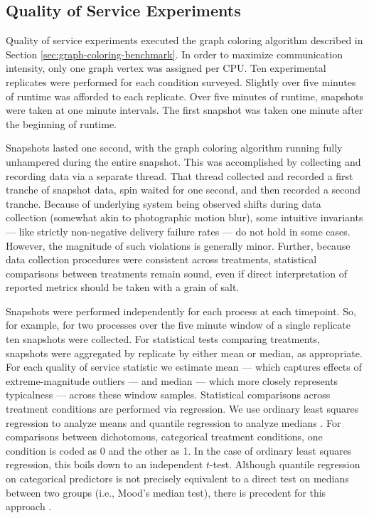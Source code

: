 \subsection{Quality of Service Experiments} \label{sec:quality-of-service-experiments}

Quality of service experiments executed the graph coloring algorithm described in Section \ref{sec:graph-coloring-benchmark}.
In order to maximize communication intensity, only one graph vertex was assigned per CPU.
Ten experimental replicates were performed for each condition surveyed.
Slightly over five minutes of runtime was afforded to each replicate.
Over five minutes of runtime, snapshots were taken at one minute intervals.
The first snapshot was taken one minute after the beginning of runtime.

Snapshots lasted one second, with the graph coloring algorithm running fully unhampered during the entire snapshot.
This was accomplished by collecting and recording data via a separate thread.
That thread collected and recorded a first tranche of snapshot data, spin waited for one second, and then recorded a second tranche.
Because of underlying system being observed shifts during data collection (somewhat akin to photographic motion blur), some intuitive invariants --- like strictly non-negative delivery failure rates --- do not hold in some cases.
However, the magnitude of such violations is generally minor.
Further, because data collection procedures were consistent across treatments, statistical comparisons between treatments remain sound, even if direct interpretation of reported metrics should be taken with a grain of salt.

Snapshots were performed independently for each process at each timepoint.
So, for example, for two processes over the five minute window of a single replicate ten snapshots were collected.
For statistical tests comparing treatments, snapshots were aggregated by replicate by either mean or median, as appropriate.
For each quality of service statistic we estimate mean --- which captures effects of extreme-magnitude outliers --- and median --- which more closely represents typicalness --- across these window samples.
Statistical comparisons across treatment conditions are performed via regression.
We use ordinary least squares regression to analyze means \citep{geladi1986partial} and quantile regression to analyze medians \citep{koenker2001quantile}.
For comparisons between dichotomous, categorical treatment conditions, one condition is coded as 0 and the other as 1.
In the case of ordinary least squares regression, this boils down to an independent $t$-test.
Although quantile regression on categorical predictors is not precisely equivalent to a direct test on medians between two groups (i.e., Mood's median test), there is precedent for this approach \citep{petscher2014quantile, konstantopoulos2019using}.

